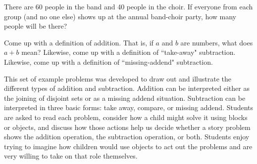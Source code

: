 \documentclass{ximera}
\begin{document}
\begin{problem}
There are 60 people in the band and 40 people in the choir.  If everyone from each group (and no one else) shows up at the annual band-choir party, how many people will be there?
\end{problem}

\begin{problem} \label{AddingUpSummary}
 Come up with a definition of addition.  That is, if $a$ and $b$ are numbers, what does $a + b$ mean?  Likewise, come up with a definition of ``take-away" subtraction.  Likewise, come up with a definition of ``missing-addend" subtraction.  
\end{problem}


\newpage
\begin{instructorNotes}
This set of example problems was developed to draw out and illustrate the different types of addition and subtraction.  Addition can be interpreted either as the joining of disjoint sets or as a missing addend situation.
Subtraction can be interpreted in three basic forms: take away, compare, or missing addend.  Students are asked to read each problem, consider how a child might solve it using blocks or objects, and discuss how those actions help us decide whether a story problem shows the addition operation, the subtraction operation, or both. Students enjoy trying to imagine how children would use objects to act out the problems and are very willing to take on that role themselves.



\end{instructorNotes}
\end{document}

